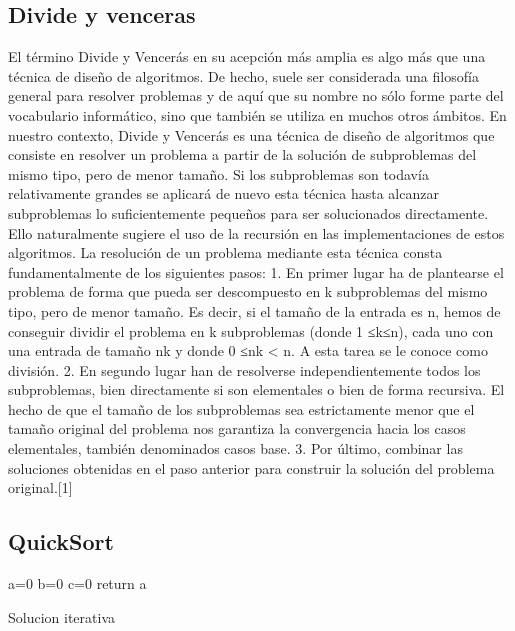 \documentclass[spanish]{article}
\begin{document}
	\subsection{Divide y venceras}	
	El  término  Divide  y  Vencerás  en  su  acepción  más  amplia  es  algo  más  que  una  técnica  de  diseño  de  algoritmos.  De  hecho,  suele  ser  considerada  una  filosofía  general  para  resolver  problemas  y  de  aquí  que  su  nombre  no  sólo  forme  parte  del  vocabulario informático, sino que también se utiliza en muchos otros ámbitos.      En nuestro contexto, Divide y Vencerás es una técnica de diseño de algoritmos que  consiste  en  resolver  un  problema  a  partir  de  la  solución  de  subproblemas  del  mismo tipo, pero de menor tamaño. Si los subproblemas son todavía relativamente grandes   se   aplicará   de   nuevo   esta   técnica   hasta   alcanzar   subproblemas   lo   suficientemente  pequeños  para  ser  solucionados  directamente.  Ello  naturalmente  sugiere el uso de la recursión en las implementaciones de estos algoritmos.       La  resolución  de  un  problema  mediante  esta  técnica  consta  fundamentalmente  de los siguientes pasos: 1.   En   primer   lugar   ha   de   plantearse   el   problema   de   forma   que   pueda   ser   descompuesto  en  k  subproblemas  del  mismo  tipo,  pero  de  menor  tamaño.  Es  decir, si el tamaño de la entrada es n, hemos de conseguir dividir el problema en k  subproblemas  (donde  1  ≤k≤n),  cada  uno  con  una  entrada  de  tamaño  nk  y  donde 0 ≤nk < n. A esta tarea se le conoce como división. 2.    En    segundo    lugar    han    de    resolverse    independientemente    todos    los    subproblemas,  bien  directamente  si  son  elementales  o  bien  de  forma  recursiva.  El hecho de que el tamaño de los subproblemas sea estrictamente menor que el tamaño  original  del  problema  nos  garantiza  la  convergencia  hacia  los  casos  elementales, también denominados casos base. 3.  Por  último,  combinar las soluciones obtenidas en el paso anterior para construir la solución del problema original.[1]	
	\subsection*{QuickSort}	
	\begin{algorithm}[H]
		a=0\;
		b=0\;
		c=0\;
		return a\;
		\caption{Solucion iterativa}
	\end{algorithm}
\end{document}
